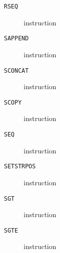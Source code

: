 \clearpage
\begin{description}
\item[\texttt{RSEQ}] instruction\\

\end{description}
\clearpage
\begin{description}
\item[\texttt{SAPPEND}] instruction\\

\end{description}
\clearpage
\begin{description}
\item[\texttt{SCONCAT}] instruction\\

\end{description}
\clearpage
\begin{description}
\item[\texttt{SCOPY}] instruction\\

\end{description}
\clearpage
\begin{description}
\item[\texttt{SEQ}] instruction\\

\end{description}
\clearpage
\begin{description}
\item[\texttt{SETSTRPOS}] instruction\\

\end{description}
\clearpage
\begin{description}
\item[\texttt{SGT}] instruction\\

\end{description}
\clearpage
\begin{description}
\item[\texttt{SGTE}] instruction\\

\end{description}
